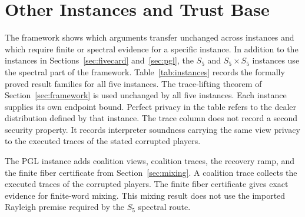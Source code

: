 \documentclass[runningheads]{llncs}
\begin{document}
\section{Other Instances and Trust Base}\label{sec:instances}

The framework shows which arguments transfer unchanged across instances and
which require finite or spectral evidence for a specific instance. In addition
to the instances in Sections~\ref{sec:fivecard} and~\ref{sec:pgl}, the $S_5$
and $S_5\times S_5$ instances use the spectral part of the framework.
Table~\ref{tab:instances} records the formally proved result families for all
five instances. The trace-lifting theorem of Section~\ref{sec:framework} is
used unchanged by all five instances. Each instance supplies its own endpoint
bound. Perfect privacy in the table refers to the dealer distribution defined
by that instance. The trace column does not record a second security property.
It records interpreter soundness carrying the same view privacy to the
executed traces of the stated corrupted players.

The PGL instance adds coalition views, coalition traces, the recovery ramp,
and the finite fiber certificate from Section~\ref{sec:mixing}. A coalition
trace collects the executed traces of the corrupted players. The finite fiber
certificate gives exact evidence for finite-word mixing. This mixing result
does not use the imported Rayleigh premise required by the $S_5$ spectral
route.
\end{document}
